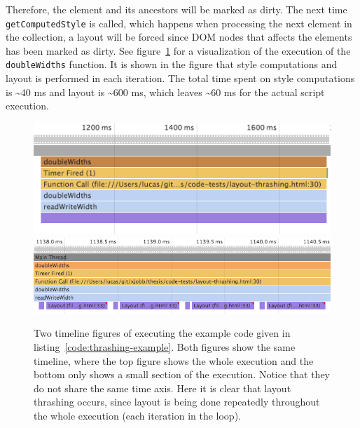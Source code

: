 \documentclass[a4paper,11pt]{kth-mag}
\newcommand{\code}[1]{\texttt{#1}}
\begin{document}
        Therefore, the element and its ancestors will be marked as dirty.
        The next time \code{getComputedStyle} is called, which happens when processing the next element in the collection, a layout will be forced since \gls{DOM} nodes that affects the elements has been marked as dirty.
        See figure~\ref{fig:layout-thrashing-example-1} for a visualization of the execution of the \code{doubleWidths} function.
        It is shown in the figure that style computations and layout is performed in each iteration.
        The total time spent on style computations is \textasciitilde40 ms and layout is \textasciitilde600 ms, which leaves \textasciitilde60 ms for the actual script execution.

        \begin{figure}[h]
          \centering
          \includegraphics[scale=0.5]{images/layout-thrashing-example-1-big}
          \includegraphics[scale=0.5]{images/layout-thrashing-example-1}
          \caption{Two timeline figures of executing the example code given in listing~\ref{code:thrashing-example}. Both figures show the same timeline, where the top figure shows the whole execution and the bottom only shows a small section of the execution. Notice that they do not share the same time axis. Here it is clear that layout thrashing occurs, since layout is being done repeatedly throughout the whole execution (each iteration in the loop).}
          \label{fig:layout-thrashing-example-1}
        \end{figure}
        
\end{document}
